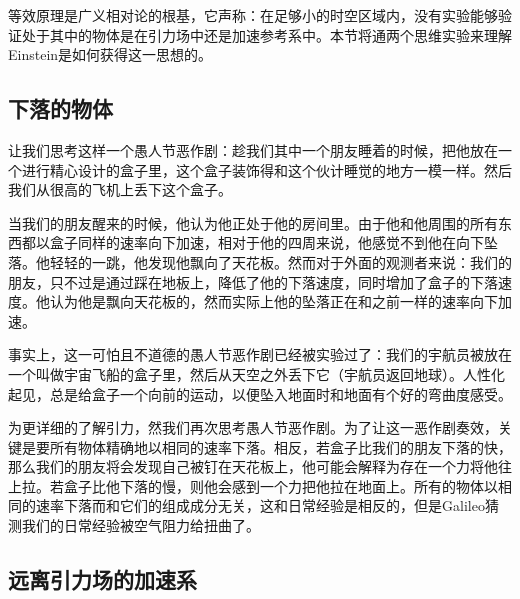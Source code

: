 
等效原理是广义相对论的根基，它声称：在足够小的时空区域内，没有实验能够验证处于其中的物体是在引力场中还是加速参考系中。本节将通两个思维实验来理解Einstein是如何获得这一思想的。

\subsection{下落的物体}
让我们思考这样一个愚人节恶作剧：趁我们其中一个朋友睡着的时候，把他放在一个进行精心设计的盒子里，这个盒子装饰得和这个伙计睡觉的地方一模一样。然后我们从很高的飞机上丢下这个盒子。

当我们的朋友醒来的时候，他认为他正处于他的房间里。由于他和他周围的所有东西都以盒子同样的速率向下加速，相对于他的四周来说，他感觉不到他在向下坠落。他轻轻的一跳，他发现他飘向了天花板。然而对于外面的观测者来说：我们的朋友，只不过是通过踩在地板上，降低了他的下落速度，同时增加了盒子的下落速度。他认为他是飘向天花板的，然而实际上他的坠落正在和之前一样的速率向下加速。

事实上，这一可怕且不道德的愚人节恶作剧已经被实验过了：我们的宇航员被放在一个叫做宇宙飞船的盒子里，然后从天空之外丢下它（宇航员返回地球）。人性化起见，总是给盒子一个向前的运动，以便坠入地面时和地面有个好的弯曲度感受。

为更详细的了解引力，然我们再次思考愚人节恶作剧。为了让这一恶作剧奏效，关键是要所有物体精确地以相同的速率下落。相反，若盒子比我们的朋友下落的快，那么我们的朋友将会发现自己被钉在天花板上，他可能会解释为存在一个力将他往上拉。若盒子比他下落的慢，则他会感到一个力把他拉在地面上。所有的物体以相同的速率下落而和它们的组成成分无关，这和日常经验是相反的，但是Galileo猜测我们的日常经验被空气阻力给扭曲了。




\subsection{远离引力场的加速系}







